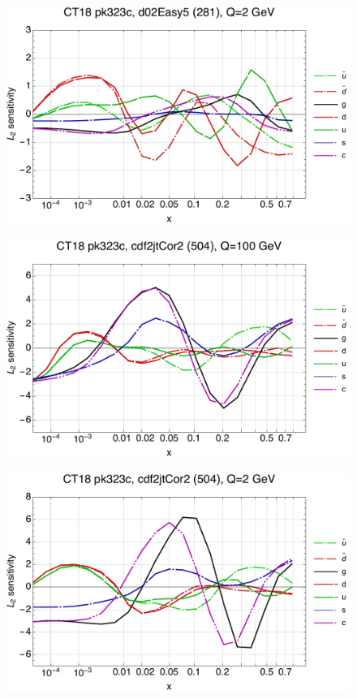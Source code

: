 \documentclass[10pt,aps,prd,floatfix,titlepage]{revtex4}
\begin{document}
\begin{figure}
\includegraphics[width=\textwidth,height=0.44\textheight,keepaspectratio]{1/281_ct18nn_L2_q2_Sf_1.pdf}
\caption{}
\end{figure}
\clearpage
\begin{figure}
\includegraphics[width=\textwidth,height=0.44\textheight,keepaspectratio]{1/504_ct18nn_L2_q100_Sf_1.pdf}
\caption{}
\end{figure}
\begin{figure}
\includegraphics[width=\textwidth,height=0.44\textheight,keepaspectratio]{1/504_ct18nn_L2_q2_Sf_1.pdf}
\caption{}
\end{figure}
\end{document}
